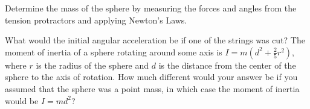 \documentclass[11pt,letterpaper]{article}
\begin{document}
Determine the mass of the sphere by measuring the forces and angles from the tension protractors and applying Newton's Laws.

What would the initial angular acceleration be if one of the strings was cut? The moment of inertia of a sphere rotating around some axis is $I=m\left(d^2+\frac{2}{5}r^2\right)$, where $r$ is the radius of the sphere and $d$ is the distance from the center of the sphere to the axis of rotation. How much different would your answer be if you assumed that the sphere was a point mass, in which case the moment of inertia would be $I=md^2$?
\end{document}
